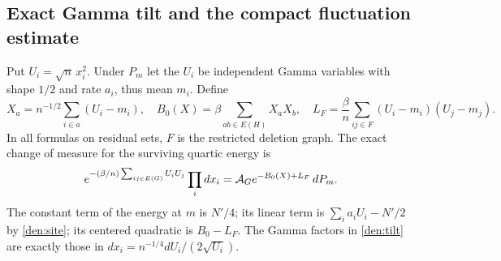 \subsection{Exact Gamma tilt and the compact fluctuation estimate}

Put \(U_i=\sqrt n\,x_i^2\). Under \(P_m\) let the \(U_i\) be independent Gamma variables with shape \(1/2\) and rate \(a_i\), thus mean \(m_i\). Define
\[
 X_a=n^{-1/2}\sum_{i\in a}(U_i-m_i),\quad
 B_0(X)=\beta\sum_{ab\in E(H)}X_aX_b,\quad
 L_F=\frac{\beta}{n}\sum_{ij\in F}(U_i-m_i)(U_j-m_j).
\]
In all formulas on residual sets, \(F\) is the restricted deletion graph. The exact change of measure for the surviving quartic energy is
\begin{equation}\label{den:tilt}
 e^{-(\beta/n)\sum_{ij\in E(G)}U_iU_j}\prod_i dx_i
       ={\cal A}_G e^{-B_0(X)+L_F}\,dP_m .
\end{equation}
The constant term of the energy at \(m\) is \(N'/4\); its linear term is \(\sum_i a_iU_i-N'/2\) by \eqref{den:site}; its centered quadratic is \(B_0-L_F\). The Gamma factors in \eqref{den:tilt} are exactly those in \(dx_i=n^{-1/4}dU_i/(2\sqrt{U_i})\).

